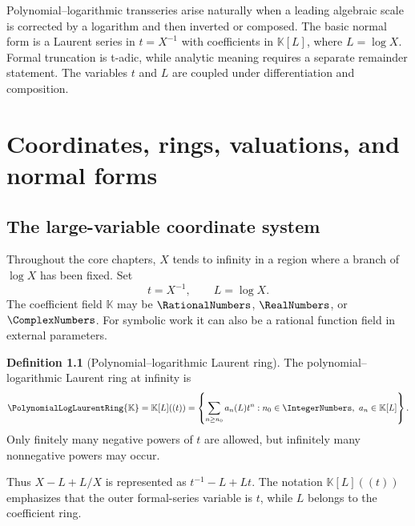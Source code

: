 \documentclass[11pt,openany]{book}
\theoremstyle{definition}
\newtheorem{definition}{Definition}[chapter]
\theoremstyle{plain}
\theoremstyle{remark}
\newcommand{\K}{\mathbb{K}}
\begin{document}
\begin{summarybox}
Polynomial--logarithmic transseries arise naturally when a leading algebraic
scale is corrected by a logarithm and then inverted or composed.  The basic
normal form is a Laurent series in \(t=X^{-1}\) with coefficients in
\(\K[L]\), where \(L=\log X\).  Formal truncation is t-adic, while analytic
meaning requires a separate remainder statement.  The variables \(t\) and
\(L\) are coupled under differentiation and composition.
\end{summarybox}

\chapter{Coordinates, rings, valuations, and normal forms}\label{ch:coordinates}

\section{The large-variable coordinate system}
Throughout the core chapters, \(X\) tends to infinity in a region where a
branch of \(\log X\) has been fixed.  Set
\begin{equation}\label{eq:qL-def}
 t=X^{-1},\qquad L=\log X.
\end{equation}
The coefficient field \(\K\) may be \(\RationalNumbers\), \(\RealNumbers\), or \(\ComplexNumbers\).  For symbolic
work it can also be a rational function field in external parameters.

\begin{definition}[Polynomial--logarithmic Laurent ring]\label{def:PL-ring}
The polynomial--logarithmic Laurent ring at infinity is
\begin{equation}\label{eq:PL-ring}
 \PolynomialLogLaurentRing{\K}=\K[L]((t))
 =\left\{\sum_{n\ge n_0}a_n(L)t^n:
 n_0\in\IntegerNumbers,\ a_n\in\K[L]\right\}.
\end{equation}
Only finitely many negative powers of \(t\) are allowed, but infinitely many
nonnegative powers may occur.
\end{definition}
Thus \(X-L+L/X\) is represented as \(t^{-1}-L+Lt\).  The notation
\(\K[L]((t))\) emphasizes that the outer formal-series variable is \(t\), while
\(L\) belongs to the coefficient ring.
\end{document}
